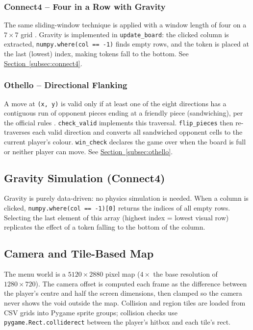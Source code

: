 \documentclass[12pt, a4paper]{article}
\begin{document}
\subsubsection{Connect4 -- Four in a Row with Gravity}
The same sliding-window technique is applied with a window length of four on a $7 \times 7$ grid \cite{connect4_rules}. Gravity is implemented in \texttt{update\_board}: the clicked column is extracted, \texttt{numpy.where(col == -1)} finds empty rows, and the token is placed at the last (lowest) index, making tokens fall to the bottom. See \hyperref[subsec:connect4]{Section~\ref*{subsec:connect4}}.

\subsubsection{Othello -- Directional Flanking}
A move at \texttt{(x, y)} is valid only if at least one of the eight directions has a contiguous run of opponent pieces ending at a friendly piece (sandwiching), per the official rules \cite{othello_rules}. \texttt{check\_valid} implements this traversal. \texttt{flip\_pieces} then re-traverses each valid direction and converts all sandwiched opponent cells to the current player's colour. \texttt{win\_check} declares the game over when the board is full or neither player can move. See \hyperref[subsec:othello]{Section~\ref*{subsec:othello}}.

\subsection{Gravity Simulation (Connect4)}

Gravity is purely data-driven: no physics simulation is needed. When a column is clicked, \texttt{numpy.where(col == -1)[0]} returns the indices of all empty rows. Selecting the last element of this array (highest index = lowest visual row) replicates the effect of a token falling to the bottom of the column.

\subsection{Camera and Tile-Based Map}

The menu world is a $5120 \times 2880$ pixel map ($4\times$ the base resolution of $1280 \times 720$). The camera offset is computed each frame as the difference between the player's centre and half the screen dimensions, then clamped so the camera never shows the void outside the map. Collision and region tiles are loaded from CSV grids into Pygame \cite{pygamece} sprite groups; collision checks use \texttt{pygame.Rect.colliderect} between the player's hitbox and each tile's rect.
\end{document}
